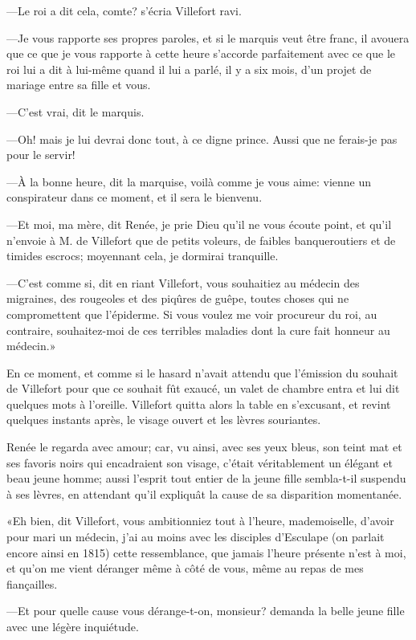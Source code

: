 —Le roi a dit cela, comte? s'écria Villefort ravi.

—Je vous rapporte ses propres paroles, et si le marquis veut être franc, il avouera que ce que je vous rapporte à cette heure s'accorde parfaitement avec ce que le roi lui a dit à lui-même quand il lui a parlé, il y a six mois, d'un projet de mariage entre sa fille et vous.

—C'est vrai, dit le marquis.

—Oh! mais je lui devrai donc tout, à ce digne prince. Aussi que ne ferais-je pas pour le servir!

—À la bonne heure, dit la marquise, voilà comme je vous aime: vienne un conspirateur dans ce moment, et il sera le bienvenu.

—Et moi, ma mère, dit Renée, je prie Dieu qu'il ne vous écoute point, et qu'il n'envoie à M. de Villefort que de petits voleurs, de faibles banqueroutiers et de timides escrocs; moyennant cela, je dormirai tranquille.

—C'est comme si, dit en riant Villefort, vous souhaitiez au médecin des migraines, des rougeoles et des piqûres de guêpe, toutes choses qui ne compromettent que l'épiderme. Si vous voulez me voir procureur du roi, au contraire, souhaitez-moi de ces terribles maladies dont la cure fait honneur au médecin.»

En ce moment, et comme si le hasard n'avait attendu que l'émission du souhait de Villefort pour que ce souhait fût exaucé, un valet de chambre entra et lui dit quelques mots à l'oreille. Villefort quitta alors la table en s'excusant, et revint quelques instants après, le visage ouvert et les lèvres souriantes.

Renée le regarda avec amour; car, vu ainsi, avec ses yeux bleus, son teint mat et ses favoris noirs qui encadraient son visage, c'était véritablement un élégant et beau jeune homme; aussi l'esprit tout entier de la jeune fille sembla-t-il suspendu à ses lèvres, en attendant qu'il expliquât la cause de sa disparition momentanée.

«Eh bien, dit Villefort, vous ambitionniez tout à l'heure, mademoiselle, d'avoir pour mari un médecin, j'ai au moins avec les disciples d'Esculape (on parlait encore ainsi en 1815) cette ressemblance, que jamais l'heure présente n'est à moi, et qu'on me vient déranger même à côté de vous, même au repas de mes fiançailles.

—Et pour quelle cause vous dérange-t-on, monsieur? demanda la belle jeune fille avec une légère inquiétude.


